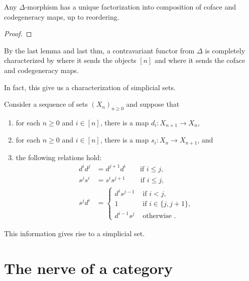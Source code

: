 \begin{lemma}
    Any \(\Delta\)-morphism has a unique factorization into composition of coface and codegeneracy maps, up to reordering.
\end{lemma}
\begin{proof}
    
\end{proof}

By the last lemma and last thm, a contravariant functor from \(\Delta\) is completely characterized by where it sends the objects  \([n]\)   and where it sends the coface and codegeneracy maps.

In fact, this give us a characterization of simplicial sets.

\begin{theorem}
    Consider a sequence of sets  \((X_n)_{n\geq 0}\) and suppose that  
    \begin{enumerate}[label=(\roman*)]
        \item for each \(n\geq 0\) and  \(i\in [n]\), there is a map \(d_i\colon X_{n+1}\to X_n\), 
        \item for each \(n\geq 0\) and  \(i\in [n]\), there is a map \(s_i\colon X_{n}\to X_{n+1}\), and
        \item the following relations hold:
        \begin{align*}
            d^id^j &= d^{j+1} d^i       \qquad\text{if } i\leq j,\\
            s^{j}s^i &= s^i s^{j+1}     \qquad\,\text{if } i\leq j,\\
            s^jd^i &= \begin{cases}
                d^i s^{j-1} &\text{ if } i <j, \\
                1 & \text{ if } i\in \{j,j+1\}, \\
                d^{i-1} s^j & \text{ otherwise }.
            \end{cases}
        \end{align*}
    \end{enumerate}
    This information gives rise to a simplicial set.
\end{theorem}

\section{The nerve of a category}


